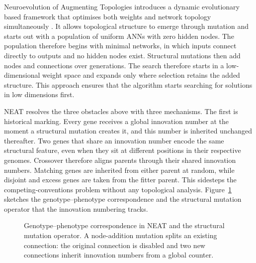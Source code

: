 \documentclass[12pt]{article}
\newcommand{\revPlain}[2]{#2}
\newcommand{\revBrit}[2]{#2}
\newcommand{\revFig}[2]{#2}
\begin{document}

Neuroevolution of Augmenting Topologies introduces a dynamic evolutionary based framework that \revBrit{E-02}{optimises both weights and network topology} simultaneously \parencite{stanley_evolving_2002}.
\revPlain{P-10}{It allows topological structure to emerge through mutation} and starts out with a population of uniform ANNs with zero hidden nodes.
The population therefore begins with minimal networks, in which inputs connect directly to outputs and no hidden nodes exist.
Structural mutations then add nodes and connections over generations. The search therefore starts in a low-dimensional weight space and expands only where selection retains the added structure.
This approach ensures that the algorithm starts searching for solutions in low dimensions first.

NEAT resolves the three obstacles above with three mechanisms.
The first is historical marking.
Every gene receives a global innovation number at the moment a structural mutation creates it, and this number is inherited unchanged thereafter.
Two genes that share an innovation number encode the same structural feature, even when they sit at different positions in their respective genomes.
Crossover therefore aligns parents through their shared innovation numbers.
Matching genes are inherited from either parent at random, while disjoint and excess genes are taken from the fitter parent.
This sidesteps the competing-conventions problem without any topological analysis.
\revFig{F-01}{Figure~\ref{fig:genotype-phenotype} sketches the genotype--phenotype correspondence} and the structural mutation operator that the innovation numbering tracks.

\begin{figure}[h]
\centering
{}
\caption{Genotype--phenotype correspondence in NEAT and the structural mutation operator. A node-addition mutation splits an existing connection: the original connection is disabled and two new connections inherit innovation numbers from a global counter.}
\label{fig:genotype-phenotype}
\end{figure}
\end{document}
